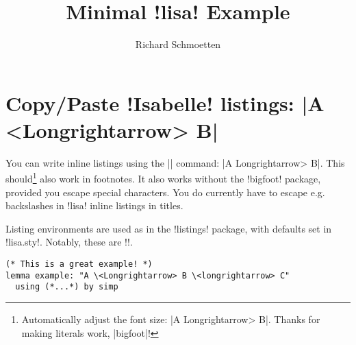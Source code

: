 \documentclass[]{article}
\title{Minimal \lisa!lisa! Example}
\author{Richard Schmoetten}
\begin{document}
\maketitle

\section{Copy/Paste \lisa!Isabelle! listings: \lisa|A \\<Longrightarrow> B|}

You can write inline listings using the \lisa|\lisa| command: \lisa|A \<Longrightarrow> B|. This should\footnote{Automatically adjust the font size: \lisa|A \<Longrightarrow> B|. Thanks for making literals work, \lisa|bigfoot|!} also work in footnotes. It also works without the \lisa!bigfoot! package, provided you escape special characters. You do currently have to escape e.g. backslashes in \lisa!lisa! inline listings in titles.

Listing environments are used as in the \lisa!listings! package, with defaults set in \lisa!lisa.sty!. Notably, these are \lisa!\footnotesize!.
\begin{lstlisting}
(* This is a great example! *)
lemma example: "A \<Longrightarrow> B \<longrightarrow> C"
  using (*...*) by simp
\end{lstlisting}
\end{document}
